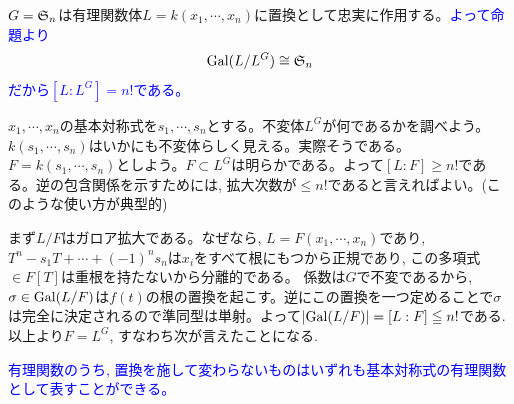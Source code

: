 \begin{eg}
$G=\mathfrak{S}_{n}$は有理関数体$L=k(x_1,\cdots, x_n)$に置換として忠実に作用する。\textcolor{blue}{よって命題より
\[\mathrm{Gal}(L/L^{G}) \cong \mathfrak{S}_{n}\]
だから$[L:L^{G}] = n!$である。}

$x_1,\cdots, x_n$の基本対称式を$s_1,\cdots, s_n$とする。不変体$L^{G}$が何であるかを調べよう。$k(s_1,\cdots, s_n)$はいかにも不変体らしく見える。実際そうである。$F=k(s_1,\cdots, s_n)$としよう。$F\subset L^{G}$は明らかである。よって$[L:F] \geq n!$である。逆の包含関係を示すためには, 拡大次数が$\leq n!$であると言えればよい。(このような使い方が典型的)

まず$L/F$はガロア拡大である。なぜなら, $L= F(x_1,\cdots, x_n)$であり, $T^{n} - s_1T + \cdots + (-1)^{n}s_n$は$x_i$をすべて根にもつから正規であり, この多項式$\in F[T]$は重根を持たないから分離的である。 係数は$G$で不変であるから, $\sigma\in \mathrm{Gal}(L/F)$は$f(t)$の根の置換を起こす。逆にこの置換を一つ定めることで$\sigma$は完全に決定されるので準同型は単射。よって$|\mathrm{Gal}(L/F)| = [L:F]\leqq n!$である. 以上より$F=L^{G}$, すなわち次が言えたことになる.

\textcolor{blue}{有理関数のうち, 置換を施して変わらないものはいずれも基本対称式の有理関数として表すことができる。}
\end{eg}




